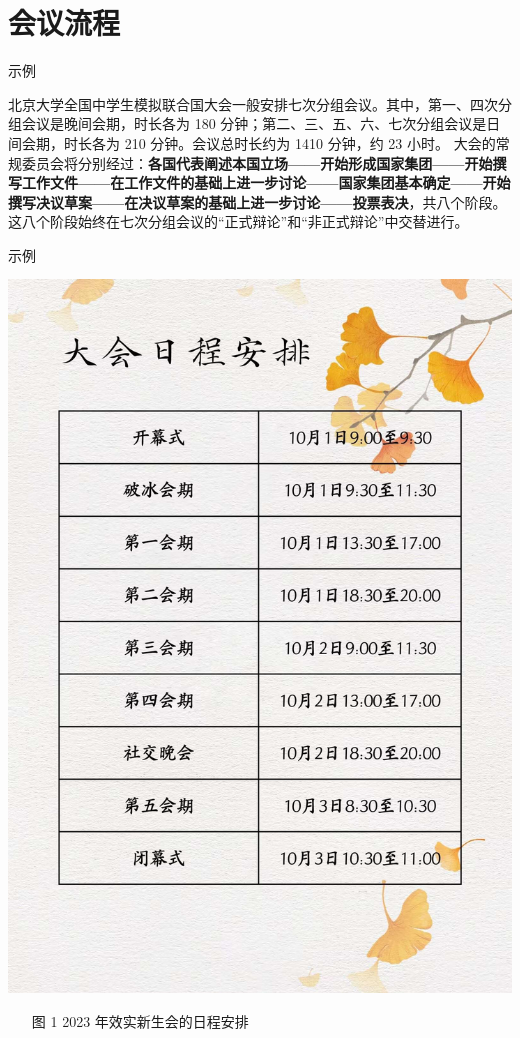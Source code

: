 \documentclass{beamer}
\begin{document}
\section{会议流程}

\begin{frame}{示例}

北京大学全国中学生模拟联合国大会一般安排七次分组会议。其中，第一、四次分组会议是晚间会期，时长各为 180 分钟；第二、三、五、六、七次分组会议是日间会期，时长各为 210 分钟。会议总时长约为 1410 分钟，约 23 小时。
大会的常规委员会将分别经过：\textbf{各国代表阐述本国立场——开始形成国家集团——开始撰写工作文件——在工作文件的基础上进一步讨论——国家集团基本确定——开始撰写决议草案——在决议草案的基础上进一步讨论——投票表决}，共八个阶段。这八个阶段始终在七次分组会议的“正式辩论”和“非正式辩论”中交替进行。

\end{frame}

\begin{frame}{示例}
    \begin{multicols}{2}
    \begin{center}\includegraphics[scale=0.08]{1.jpg}\end{center}\begin{tiny}\begin{itemize}\item[图 1] 2023 年效实新生会的日程安排\end{itemize}\end{tiny}
    \end{multicols}
\end{frame}
\end{document}
